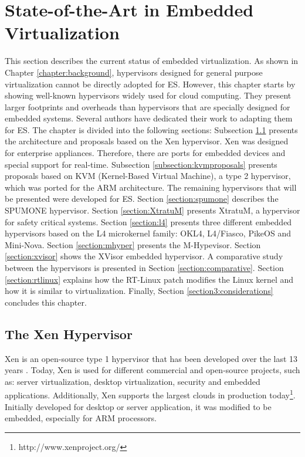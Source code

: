 \chapter{\label{chapter:stateofart}State-of-the-Art in Embedded Virtualization}

This section describes the current status of embedded virtualization. As shown in Chapter \ref{chapter:background}, hypervisors designed for general purpose virtualization cannot be directly adopted for ES. However, this chapter starts by showing well-known hypervisors widely used for cloud computing. They present larger footprints and overheads than hypervisors that are specially designed for embedded systems. Several authors have dedicated their work to adapting them for ES. The chapter is divided into the following sections:  Subsection \ref{section:xen} presents the architecture and proposals based on the Xen hypervisor. Xen was designed for enterprise appliances. Therefore, there are ports for embedded devices and special support for real-time. Subsection \ref{subsection:kvmproposals} presents proposals based on KVM (Kernel-Based Virtual Machine), a type 2 hypervisor, which was ported for the ARM architecture. The remaining hypervisors that will be presented were developed for  ES. Section \ref{section:spumone} describes the SPUMONE hypervisor. Section \ref{section:XtratuM} presents XtratuM, a hypervisor for safety critical systems. Section \ref{section:l4} presents three different embedded hypervisors based on the L4 microkernel family: OKL4, L4/Fiasco, PikeOS and Mini-Nova. Section \ref{section:mhyper} presents the M-Hypevisor. Section \ref{section:xvisor} shows the XVisor embedded hypervisor. A comparative study between the hypervisors is presented in Section \ref{section:comparative}. Section \ref{section:rtlinux} explains how the RT-Linux patch modifies the Linux kernel and how it is similar to virtualization. Finally, Section \ref{section3:considerations} concludes this chapter. 


\section{The Xen Hypervisor}
\label{section:xen}

Xen is an open-source type 1 hypervisor that has been developed over the last 13 years \cite{xen2003}. Today, Xen is used for different commercial and open-source projects, such as: server virtualization, desktop virtualization, security and embedded applications. Additionally, Xen supports the largest clouds in production today\footnote{http://www.xenproject.org/}. Initially developed for desktop or server application, it was modified to be embedded, especially for ARM processors.

